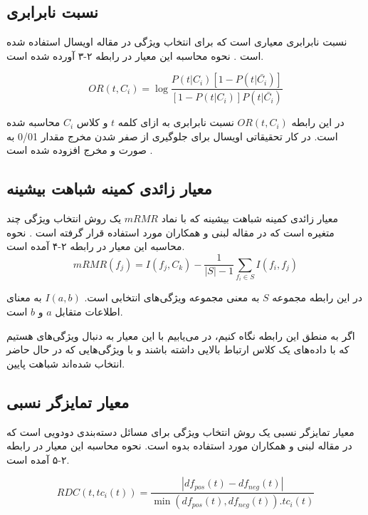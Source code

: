 \subsection{نسبت نابرابری}
نسبت نابرابری
معیاری است که برای انتخاب ویژگی در مقاله اویسال
استفاده شده است
\cite{uysal2016improved}
. نحوه محاسبه این معیار در رابطه ۲-۳ آورده شده است.

\begin{equation}
OR(t, C_i) = \log{\frac{P(t|C_i)[1-P(t|\bar{C_i})]}{[1-P(t|C_i)]P(t|\bar{C_i})}}
\end{equation}

در این رابطه
$OR(t, C_i)$
نسبت نابرابری به ازای کلمه
$t$
و کلاس
$C_i$
محاسبه شده است. در کار تحقیقاتی اویسال برای جلوگیری از صفر شدن مخرج مقدار 0/01 به صورت و مخرج افزوده شده است
\cite{uysal2016improved}
.

\subsection{معیار زائدی کمینه شباهت بیشینه}
معیار زائدی کمینه شباهت بیشینه
که با نماد 
$mRMR$
یک روش انتخاب ویژگی چند متغیره است که در مقاله لبنی و همکاران مورد استفاده قرار گرفته است
\cite{labani2018novel}
. نحوه محاسبه این معیار در رابطه ۲-۴ آمده است.
\begin{equation}
mRMR(f_j) = I(f_j, C_k) - \frac{1}{|S|-1} \sum_{f_i \in S} I(f_i, f_j)
\end{equation}

در این رابطه مجموعه
$S$
به معنی مجموعه ویژگی‌های انتخابی است.
$I(a, b)$
به معنای اطلاعات متقابل
$a$
و
$b$
است.

اگر به منطق این رابطه نگاه کنیم، در می‌یابیم با این معیار به دنبال ویژگی‌های هستیم که با داده‌های یک کلاس ارتباط بالایی داشته باشند و با ویژگی‌هایی که در حال حاضر انتخاب شده‌‌اند شباهت پایین.

\subsection{معیار تمایزگر نسبی}
معیار تمایزگر نسبی یک روش انتخاب ویژگی برای مسائل دسته‌بندی دودویی است که در مقاله لبنی و همکاران\cite{labani2018novel} مورد استفاده بدوه است. نحوه محاسبه این معیار در رابطه ۲-۵ آمده است.

\begin{equation}
RDC(t, tc_i(t)) = \frac{|df_{pos}(t)-df_{neg}(t)|}{\min(df_{pos}(t),df_{neg}(t)).tc_i(t)}
\end{equation}

